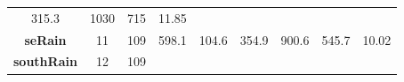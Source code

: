 \documentclass[]{article}
\theoremstyle{definition}
\theoremstyle{definition}
\theoremstyle{definition}
\theoremstyle{remark}
\begin{document}
\begin{longtable}[]{@{}ccccccccc@{}}
\begin{minipage}[t]{0.08\columnwidth}
315.3\strut
\end{minipage} & \begin{minipage}[t]{0.07\columnwidth}\centering\strut
1030\strut
\end{minipage} & \begin{minipage}[t]{0.07\columnwidth}\centering\strut
715\strut
\end{minipage} & \begin{minipage}[t]{0.08\columnwidth}\centering\strut
11.85\strut
\end{minipage}\tabularnewline
\begin{minipage}[t]{0.14\columnwidth}\centering\strut
\textbf{seRain}\strut
\end{minipage} & \begin{minipage}[t]{0.06\columnwidth}\centering\strut
11\strut
\end{minipage} & \begin{minipage}[t]{0.05\columnwidth}\centering\strut
109\strut
\end{minipage} & \begin{minipage}[t]{0.11\columnwidth}\centering\strut
598.1\strut
\end{minipage} & \begin{minipage}[t]{0.08\columnwidth}\centering\strut
104.6\strut
\end{minipage} & \begin{minipage}[t]{0.08\columnwidth}\centering\strut
354.9\strut
\end{minipage} & \begin{minipage}[t]{0.07\columnwidth}\centering\strut
900.6\strut
\end{minipage} & \begin{minipage}[t]{0.07\columnwidth}\centering\strut
545.7\strut
\end{minipage} & \begin{minipage}[t]{0.08\columnwidth}\centering\strut
10.02\strut
\end{minipage}\tabularnewline
\begin{minipage}[t]{0.14\columnwidth}\centering\strut
\textbf{southRain}\strut
\end{minipage} & \begin{minipage}[t]{0.06\columnwidth}\centering\strut
12\strut
\end{minipage} & \begin{minipage}[t]{0.05\columnwidth}\centering\strut
109\strut
\end{minipage} & \begin{minipage}[t]{0.11\columnwidth}\centering\strut

\end{minipage}
\end{longtable}
\end{document}
